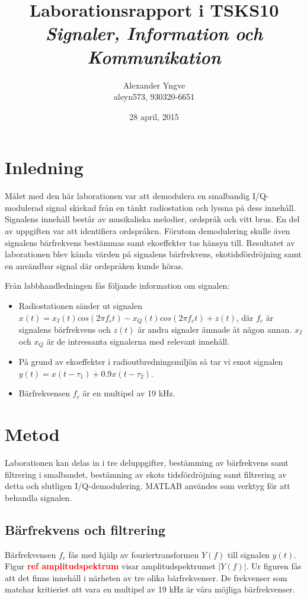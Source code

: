 \documentclass[10pt,twocolumn]{article}
\title{Laborationsrapport i TSKS10 \emph{Signaler, Information och Kommunikation}}
\author{Alexander Yngve\\aleyn573, 930320-6651}
\date{28 april, 2015}
\newcommand{\todo}[1]{\textbf{\textcolor{red}{#1}}}
\begin{document}
\begin{figure}
  
\end{figure}

\maketitle

\clearpage

\section{Inledning}

Målet med den här laborationen var att demodulera en smalbandig I/Q-modulerad signal skickad från en tänkt radiostation och lyssna på dess innehåll. Signalens innehåll består av musikaliska melodier, ordspråk och vitt brus. En del av uppgiften var att identifiera ordspråken. Förutom demodulering skulle även signalens bärfrekvens bestämmas samt ekoeffekter tas hänsyn till. Resultatet av laborationen blev kända värden på signalens bärfrekvens, ekotidsfördröjning samt en användbar signal där ordspråken kunde höras.

Från labbhandledningen fås följande information om signalen:

\begin{itemize}
\item Radiostationen sänder ut signalen $x(t) = x_I(t)cos(2\pi f_ct) - x_Q(t)cos(2\pi f_ct) + z(t)$, där $f_c$ är signalens bärfrekvens och $z(t)$ är andra signaler ämnade åt någon annan. $x_I$ och $x_Q$ är de intressanta signalerna med relevant innehåll.
\item På grund av ekoeffekter i radioutbredningsmiljön så tar vi emot signalen $y(t) = x(t - \tau_1) + 0.9x(t - \tau_2)$. 
\item Bärfrekvensen $f_c$ är en multipel av 19 kHz.
\end{itemize}

\section{Metod}

Laborationen kan delas in i tre deluppgifter, bestämming av bärfrekvens samt filtrering i smalbandet, bestämning av ekots tidsfördröjning samt filtrering av detta och slutligen I/Q-demodulering. MATLAB användes som verktyg för att behandla signalen.

\subsection{Bärfrekvens och filtrering}
Bärfrekvensen $f_c$ fås med hjälp av fouriertransformen $Y(f)$ till signalen $y(t)$. Figur \todo{ref amplitudspektrum} visar amplitudspektrumet $|Y(f)|$. Ur figuren fås att det finns innehåll i närheten av tre olika bärfrekvenser. De frekvenser som matchar kritieriet att vara en multipel av 19 kHz är våra möjliga bärfrekvenser.
\end{document}
